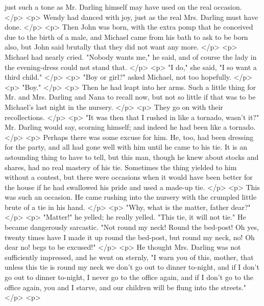       just such a tone as Mr. Darling himself may have used on the real
      occasion.
    </p>
    <p>
      Wendy had danced with joy, just as the real Mrs. Darling must have done.
    </p>
    <p>
      Then John was born, with the extra pomp that he conceived due to the birth
      of a male, and Michael came from his bath to ask to be born also, but John
      said brutally that they did not want any more.
    </p>
    <p>
      Michael had nearly cried. "Nobody wants me," he said, and of course the
      lady in the evening-dress could not stand that.
    </p>
    <p>
      "I do," she said, "I so want a third child."
    </p>
    <p>
      "Boy or girl?" asked Michael, not too hopefully.
    </p>
    <p>
      "Boy."
    </p>
    <p>
      Then he had leapt into her arms. Such a little thing for Mr. and Mrs.
      Darling and Nana to recall now, but not so little if that was to be
      Michael's last night in the nursery.
    </p>
    <p>
      They go on with their recollections.
    </p>
    <p>
      "It was then that I rushed in like a tornado, wasn't it?" Mr. Darling
      would say, scorning himself; and indeed he had been like a tornado.
    </p>
    <p>
      Perhaps there was some excuse for him. He, too, had been dressing for the
      party, and all had gone well with him until he came to his tie. It is an
      astounding thing to have to tell, but this man, though he knew about
      stocks and shares, had no real mastery of his tie. Sometimes the thing
      yielded to him without a contest, but there were occasions when it would
      have been better for the house if he had swallowed his pride and used a
      made-up tie.
    </p>
    <p>
      This was such an occasion. He came rushing into the nursery with the
      crumpled little brute of a tie in his hand.
    </p>
    <p>
      "Why, what is the matter, father dear?"
    </p>
    <p>
      "Matter!" he yelled; he really yelled. "This tie, it will not tie." He
      became dangerously sarcastic. "Not round my neck! Round the bed-post! Oh
      yes, twenty times have I made it up round the bed-post, but round my neck,
      no! Oh dear no! begs to be excused!"
    </p>
    <p>
      He thought Mrs. Darling was not sufficiently impressed, and he went on
      sternly, "I warn you of this, mother, that unless this tie is round my
      neck we don't go out to dinner to-night, and if I don't go out to dinner
      to-night, I never go to the office again, and if I don't go to the office
      again, you and I starve, and our children will be flung into the streets."
    </p>
    <p>

